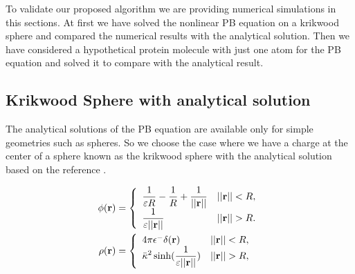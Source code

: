 To validate our proposed algorithm we are providing numerical simulations in this sections. At first we have solved the nonlinear PB equation on a krikwood sphere and compared the numerical results with the analytical solution. Then we have considered a hypothetical protein molecule with just one atom for the PB equation and solved it to compare with the analytical result. 


\subsection{Krikwood Sphere with analytical solution}
\label{krik}

The analytical solutions of the PB equation are available only for simple geometries such as spheres. So we choose the case where we have a charge at the center of a sphere known as the krikwood sphere  with the analytical solution based on the reference \cite{Geng2013_Fully}. 



\begin{align}\label{Eq_sphere1}
   	\phi({\bf r})&=\left\{\begin{array}{lc}\displaystyle\frac{1}{\varepsilon R}-\frac{1}{R}+\displaystyle\frac{1}{||{\bf r}||} & ||{\bf r}||<R, \\
	\displaystyle\frac{1}{\varepsilon ||{\bf r}||}& ||{\bf r}||>R.\end{array}\right.\\\label{Eq_sphere2}
	  	\rho({\bf r})&=\left\{\begin{array}{lc}4\pi \epsilon^-\delta ({\bf r)} & ||{\bf r}||<R, \\ \displaystyle\bar{\kappa}^2\sinh (\frac{1}{\varepsilon ||{\bf r}||}) & ||{\bf r}||>R,\end{array}\right.
\end{align}


